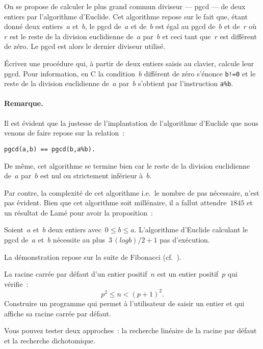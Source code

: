 \begin{exercice}
  \label{ex:AlgorithmeEuclideIteratif}
  On se propose de calculer le plus grand commun diviseur --- pgcd ---
  de  deux entiers par l'algorithme  d'Euclide.  Cet algorithme repose
  sur le fait que,  \'etant donn\'e deux  entiers~$a$ et~$b$,  le pgcd
  de~$a$ et de~$b$ est \'egal au  pgcd de~$b$ et de~$r$ o\`u~${r}$ est
  le reste  de la division  euclidienne  de~$a$ par~$b$ et  ceci  tant
  que~$r$  est  diff\'erent de z\'ero.   Le  pgcd est alors le dernier
  diviseur utilis\'e.
  \par
  \'Ecrivez une proc\'edure qui, \`a partir de  deux entiers saisis au
  clavier, calcule leur pgcd. Pour information,  en C la condition~$b$
  diff\'erent de z\'ero   s'\'enonce \texttt{b!=0} et  le reste  de la
  division   euclidienne  de~$a$ par~$b$  s'obtient  par l'instruction
  \texttt{a\%{}b}.
  \ifcorrection
  \begin{correction}
    
  \end{correction}
  \fi
  \paragraph{Remarque.}
  Il est \'evident que  la justesse de l'implantation  de l'algorithme
  d'Euclide que nous venons de faire repose sur la relation~:
\begin{verbatim}
pgcd(a,b) == pgcd(b,a%b).
\end{verbatim}
  De  m\^eme,   cet algorithme  se  termine  bien car  le  reste de la
  division   euclidienne  de~$a$   par~$b$  est  nul   ou  strictement
  inf\'erieur \`a~$b$.
  \par
  Par contre, la complexit\'e de  cet algorithme i.e.~le nombre de pas
  n\'ecessaire, n'est   pas  \'evident. Bien  que cet  algorithme soit
  mill\'enaire, il a fallut attendre~$1845$ et un r\'esultat de Lam\'e
  pour avoir la proposition~:
  \par
  Soient~$a$ et~$b$ deux entiers  avec~${0\leq b\leq a}$. L'algorithme
  d'Euclide  calculant  le     pgcd  de~$a$  et~$b$   n\'ecessite   au
  plus~${3\,(log b)/2+1}$ pas d'ex\'ecution.
  \par
  La   d\'emonstration    repose   sur     la   suite   de   Fibonacci
  (cf.~\cite[\S~1.4.4]{Demazure1997}).
\end{exercice}
\begin{exercice}
  La racine carr\'ee par    d\'efaut d'un entier positif~$n$  est   un
  entier positif~$p$ qui v\'erifie~:
  $$
  p^{2}\leq n <(p+1)^{2}.
  $$
  Construire un programme qui permet \`a l'utilisateur de saisir un
  entier et qui affiche sa racine carr\'ee par d\'efaut.
  \par
  Vous pouvez tester deux  approches~:  la recherche lin\'eaire de  la
  racine par d\'efaut et la recherche dichotomique.
  \ifcorrection
  \begin{correction}
    
  \end{correction}
  \fi
\end{exercice}

